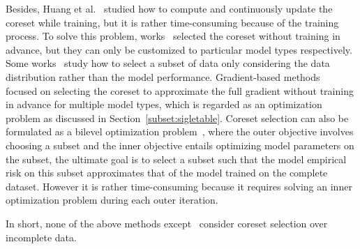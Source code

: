 %
Besides, 
  Huang et al.~\cite{DBLP:conf/icml/HuangHLFD21} studied how to compute and continuously update the coreset while training, %
but it is rather time-consuming because of the training process. 
 To solve this problem, works~\cite{DBLP:conf/icml/CampbellB18, DBLP:journals/corr/BravermanFL16}   selected the coreset without training in advance, but they can only be customized to particular model types respectively. %
 Some works~\cite{sener2017active,chen2012super, Zhang2019SmallGAN, Agarwal2020Context} study how to select a subset of data only considering the data distribution rather than   the model performance.
 Gradient-based methods~\cite{DBLP:conf/icml/MirzasoleimanBL20,  recon, DBLP:conf/emnlp/KirchhoffB14, Mirzasoleiman2020Coresetnoisy,  fastcore} focused on selecting the coreset to approximate the full gradient without training in advance for multiple model types, which is regarded as an optimization problem as discussed in Section~\ref{subset:sigletable}.
 Coreset selection can also be formulated as a bilevel optimization problem~\cite{borsos2020coresets, killamsetty2021retrieve, Killamsetty2022GLISTER}, where the outer objective involves choosing a subset and the inner objective entails optimizing model parameters on the subset, the ultimate goal is to select a subset such that the model empirical risk on this subset  approximates that of the model trained on the complete dataset. However it is rather time-consuming because it requires solving an inner optimization problem during each outer iteration. 
 
In short, none of the above methods except~\cite{goodcore}  consider coreset selection over incomplete data.


